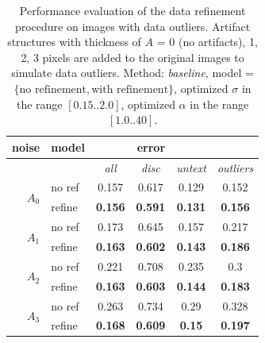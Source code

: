 \begin{table}[ht] \scriptsize
  \centering
  \caption{Performance evaluation of the data refinement procedure on images with data outliers. Artifact structures with thickness of $A$ = 0 (no artifacts), 1, 2, 3 pixels are added to the original images to simulate data outliers. Method: \textit{baseline}, model = $\lbrace \text{no refinement}, \text{with refinement} \rbrace$, optimized $\sigma$ in the range $[0.15 .. 2.0]$,  optimized $\alpha$ in the range $[1.0 .. 40]$.}
    \begin{tabular}{rrcrrr}
    \toprule
    \multicolumn{1}{c}{noise} & \multicolumn{1}{c}{model} & \multicolumn{3}{c}{error} &  \\
    \midrule
          &       & \textit{all} & \multicolumn{1}{c}{\textit{disc}} & \multicolumn{1}{c}{\textit{untext}} & \multicolumn{1}{c}{\textit{outliers}} \\
         \midrule
         \midrule
    \multicolumn{1}{r}{\multirow{2}[0]{*}{$A_0$}} & \multicolumn{1}{l}{no ref} & 0.157 & \multicolumn{1}{c}{0.617} & \multicolumn{1}{c}{0.129} & \multicolumn{1}{c}{0.152} \\
          & \multicolumn{1}{l}{refine} & \textbf{0.156} & \multicolumn{1}{c}{\textbf{0.591}} & \multicolumn{1}{c}{\textbf{0.131}} & \multicolumn{1}{c}{\textbf{0.156}} \\
          \midrule
    \multicolumn{1}{r}{\multirow{2}[0]{*}{$A_1$}} & \multicolumn{1}{l}{no ref} & 0.173 & \multicolumn{1}{c}{0.645} & \multicolumn{1}{c}{0.157} & \multicolumn{1}{c}{0.217} \\
          & \multicolumn{1}{l}{refine} & \textbf{0.163} & \multicolumn{1}{c}{\textbf{0.602}} & \multicolumn{1}{c}{\textbf{0.143}} & \multicolumn{1}{c}{\textbf{0.186}} \\
          \midrule
    \multicolumn{1}{r}{\multirow{2}[0]{*}{$A_2$}} & \multicolumn{1}{l}{no ref} & 0.221 & \multicolumn{1}{c}{0.708} & \multicolumn{1}{c}{0.235} & \multicolumn{1}{c}{0.3} \\
          & \multicolumn{1}{l}{refine} & \textbf{0.163} & \multicolumn{1}{c}{\textbf{0.603}} & \multicolumn{1}{c}{\textbf{0.144}} & \multicolumn{1}{c}{\textbf{0.183}} \\
          \midrule
    \multicolumn{1}{r}{\multirow{2}[0]{*}{$A_3$}} & \multicolumn{1}{l}{no ref} & 0.263 & \multicolumn{1}{c}{0.734} & \multicolumn{1}{c}{0.29} & \multicolumn{1}{c}{0.328} \\
          & \multicolumn{1}{l}{refine} & \textbf{0.168} & \multicolumn{1}{c}{\textbf{0.609}} & \multicolumn{1}{c}{\textbf{0.15}} & \multicolumn{1}{c}{\textbf{0.197}} \\
    \bottomrule
    \end{tabular}%
  \label{tab:exp_refine}%
\end{table}%


